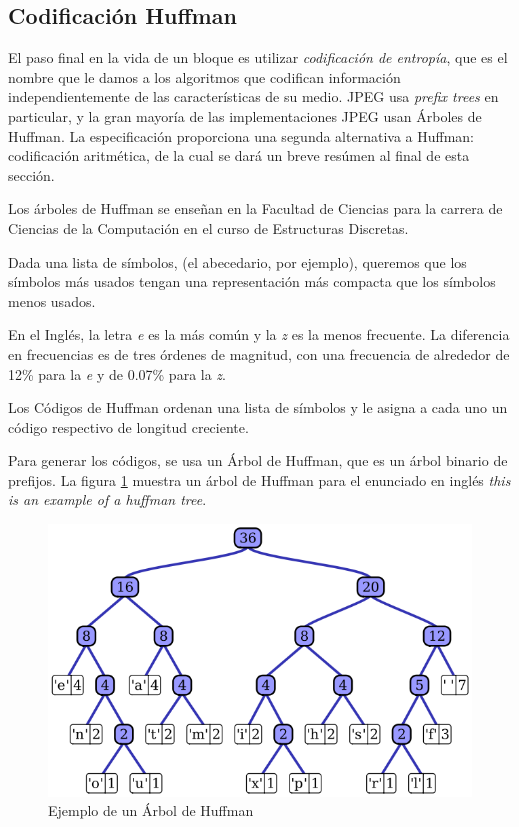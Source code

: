 
\subsection{Codificación Huffman}\label{sub:huffman}

El paso final en la vida de un bloque es utilizar \emph{codificación de
entropía}, que es el nombre que le damos a los algoritmos que codifican
información independientemente de las características de su medio. JPEG usa
\emph{prefix trees} en particular, y la gran mayoría de las implementaciones
JPEG usan Árboles de Huffman. La especificación proporciona una segunda
alternativa a Huffman: codificación aritmética, de la cual se dará un breve
resúmen al final de esta sección.

Los árboles de Huffman se enseñan en la Facultad de Ciencias para la carrera de
Ciencias de la Computación en el curso de Estructuras Discretas.

Dada una lista de símbolos, (el abecedario, por ejemplo), queremos que los
símbolos más usados tengan una representación más compacta que los símbolos
menos usados.

En el Inglés, la letra \emph{ e } es la más común y la \emph{ z } es la menos
frecuente.  \cite{Espanol} La diferencia en frecuencias es de tres órdenes de
magnitud, con una frecuencia de alrededor de 12\% para la \emph{e} y de 0.07\%
para la \emph{z}.

Los \gls{Códigos de Huffman} ordenan una lista de símbolos y le asigna a cada uno un
código respectivo de longitud creciente.

Para generar los códigos, se usa un Árbol de Huffman, que es un árbol binario
de prefijos. La figura \ref{fig:huffman} muestra un árbol de Huffman para el
enunciado en inglés \emph{this is an example of a huffman tree}.

\begin{figure}[h]
    \includegraphics[width=1.0\textwidth]{Huffman}
    \caption{Ejemplo de un Árbol de Huffman}
    \label{fig:huffman}
\end{figure}

